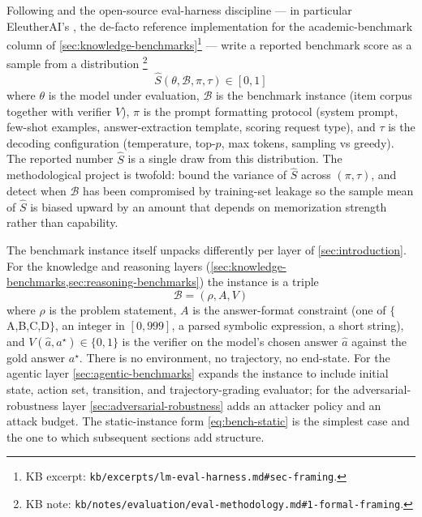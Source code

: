 Following \citet{liang2022-helm} and the open-source eval-harness
discipline --- in particular EleutherAI's
\texttt{} \citep{lm-eval-harness}, the
de-facto reference implementation for the academic-benchmark
column of \cref{sec:knowledge-benchmarks}\footnote{KB excerpt:
\nolinkurl{kb/excerpts/lm-eval-harness.md#sec-framing}.} ---
write a reported benchmark score as a sample from a distribution%
\footnote{KB note: \nolinkurl{kb/notes/evaluation/eval-methodology.md#1-formal-framing}.}
\begin{equation}
\hat{S}(\theta, \mathcal{B}, \pi, \tau) \in [0, 1]
\label{eq:score-rv}
\end{equation}
where $\theta$ is the model under evaluation, $\mathcal{B}$ is the
benchmark instance (item corpus together with verifier $V$), $\pi$ is
the prompt formatting protocol (system prompt, few-shot examples,
answer-extraction template, scoring request type), and $\tau$ is the
decoding configuration (temperature, top-$p$, max tokens, sampling vs
greedy). The reported number $\hat{S}$ is a single draw from this
distribution. The methodological project is twofold: bound the
variance of $\hat{S}$ across $(\pi, \tau)$, and detect when
$\mathcal{B}$ has been compromised by training-set leakage so the
sample mean of $\hat{S}$ is biased upward by an amount that depends
on memorization strength rather than capability.

The benchmark instance itself unpacks differently per layer of
\cref{sec:introduction}. For the knowledge and reasoning layers
(\cref{sec:knowledge-benchmarks,sec:reasoning-benchmarks}) the
instance is a triple
\begin{equation}
\mathcal{B} = (\rho, A, V)
\label{eq:bench-static}
\end{equation}
where $\rho$ is the problem statement, $A$ is the answer-format
constraint (one of $\{$A,B,C,D$\}$, an integer in $[0, 999]$, a
parsed symbolic expression, a short string), and
$V(\hat{a}, a^\star) \in \{0, 1\}$ is the verifier on the model's
chosen answer $\hat{a}$ against the gold answer $a^\star$. There is
no environment, no trajectory, no end-state. For the agentic layer
\cref{sec:agentic-benchmarks} expands the instance to include initial
state, action set, transition, and trajectory-grading evaluator; for
the adversarial-robustness layer \cref{sec:adversarial-robustness}
adds an attacker policy and an attack budget. The static-instance
form \eqref{eq:bench-static} is the simplest case and the one to
which subsequent sections add structure.

